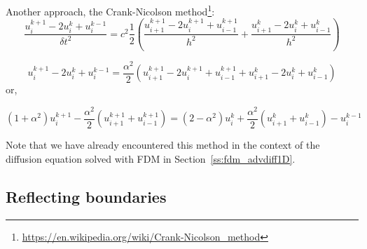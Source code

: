 Another approach, the Crank-Nicolson method\footnote{\url{https://en.wikipedia.org/wiki/Crank-Nicolson_method}}:
\[
\frac{ u_i^{k+1} -2u_i^{k} +u_i^{k-1}  }{\delta\! t^2} = 
c^2 \frac12 \left(
\frac{ u_{i+1}^{k+1} -2u_{i}^{k+1} +u_{i-1}^{k+1}  }{h^2} 
+
\frac{ u_{i+1}^k -2u_{i}^k +u_{i-1}^k  }{h^2} 
\right)
\]


\[
u_i^{k+1} -2u_i^{k} +u_i^{k-1} 
=
\frac{\alpha^2}{2} \left(
u_{i+1}^{k+1} -2u_{i}^{k+1} +u_{i-1}^{k+1} 
+
u_{i+1}^k -2u_{i}^k +u_{i-1}^k 
\right)
\]
or,
\begin{mdframed}[backgroundcolor=blue!5]
\begin{equation}
(1+\alpha^2) u_i^{k+1} 
-\frac{\alpha^2}{2} (u_{i+1}^{k+1} +u_{i-1}^{k+1} )
=
(2-\alpha^2) u_i^{k} 
+\frac{\alpha^2}{2} (u_{i+1}^{k} +u_{i-1}^{k} )
-u_i^{k-1} 
\end{equation}
\end{mdframed}

Note that we have already encountered this method in the context of the 
diffusion equation solved with FDM in Section~\ref{ss:fdm_advdiff1D}.

\subsection{Reflecting boundaries}

